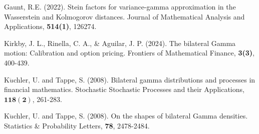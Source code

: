 \documentclass[12pt, a4paper,reqno]{amsart}
\theoremstyle{definition}
\theoremstyle{myremark}
\numberwithin{equation}{section}
\begin{document}
\begin{thebibliography}{}
	Gaunt, R.E. (2022). Stein factors for variance-gamma approximation in the Wasserstein and Kolmogorov distances. Journal of Mathematical Analysis and Applications, \textbf{514(1)}, 126274.
	
	
	Kirkby, J. L., Rinella, C. A., \& Aguilar, J. P. (2024). The bilateral Gamma motion: Calibration and option pricing. Frontiers of Mathematical Finance, \textbf{3(3)}, 400-439.
	
	 K$\ddot{u}$chler, U. and Tappe, S. (2008). Bilateral gamma distributions and processes in financial mathematics. Stochastic Stochastic Processes and their Applications, $\mathbf{118(2)}$, 261-283.
	
	 K$\ddot{u}$chler, U. and Tappe, S. (2008). On the shapes of bilateral Gamma densities. Statistics \& Probability Letters, \textbf{78}, 2478-2484.
	

\end{thebibliography}
\end{document}

